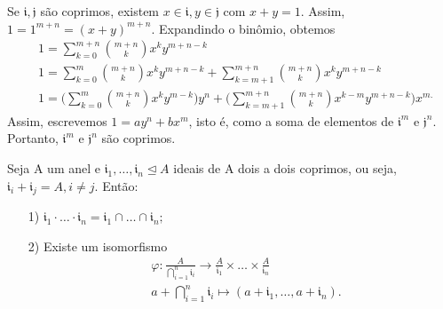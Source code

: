 \documentclass[algebraII_notes.tex]{subfiles}
\begin{document}
\begin{proof*}
	Se \(\mathfrak{i}, \mathfrak{j}\) são coprimos, existem \(x\in \mathfrak{i}, y\in \mathfrak{j}\) com \(x+y = 1.\)
	Assim, \(1 = 1^{m+n} = (x+y)^{m+n}.\) Expandindo o binômio, obtemos
	\begin{align*}
		 & 1 = \sum\limits_{k=0}^{m+n}\binom{m+n}{k}x^{k}y^{m+n-k}                                                                                            \\
		 & 1 = \sum\limits_{k=0}^{m}\binom{m+n}{k}x^{k}y^{m+n-k} + \sum\limits_{k=m+1}^{m+n}\binom{m+n}{k}x^{k}y^{m+n-k}                                      \\
		 & 1 = \biggl(\sum\limits_{k=0}^{m}\binom{m+n}{k}x^{k}y^{m-k}\biggr)y^{n}+\biggl(\sum\limits_{k=m+1}^{m+n}\binom{m+n}{k}x^{k-m}y^{m+n-k}\biggr)x^{m.}
	\end{align*}
	Assim, escrevemos \(1 = ay^{n}+bx^{m}\), isto é, como a soma de elementos de \(\mathfrak{i}^{m}\) e \(\mathfrak{j}^{n}.\) Portanto,
	\(\mathfrak{i}^{m}\) e \(\mathfrak{j}^{n}\) são coprimos. \qedsymbol
\end{proof*}
\hypertarget{chinese_remainder}{
	\begin{theorem*}
		Seja A um anel e \(\mathfrak{i}_{1},\dotsc,\mathfrak{i}_{n}\trianglelefteq{A}\) ideais de A dois a dois coprimos, ou seja,
		\(\mathfrak{i}_{i}+\mathfrak{i}_{j}=A, i\neq j.\) Então:
		\begin{itemize}
			\item[1)] \(\mathfrak{i}_{1}\cdot \dotsc \cdot \mathfrak{i}_{n} = \mathfrak{i}_{1}\cap \dotsc\cap \mathfrak{i}_{n};\)
			\item[2)] Existe um isomorfismo
			      \begin{align*}
				       & \varphi :\frac{A}{\bigcap_{i=1}^{n}\mathfrak{i}_{i}}\rightarrow \frac{A}{\mathfrak{i}_{1}}\times \dotsc\times \frac{A}{\mathfrak{i}_{n}} \\
				       & a+\bigcap_{i=1}^{n}\mathfrak{i}_{i}\mapsto(a+\mathfrak{i}_{1}, \dotsc, a+\mathfrak{i}_{n}).
			      \end{align*}
		\end{itemize}
	\end{theorem*}}
\end{document}
